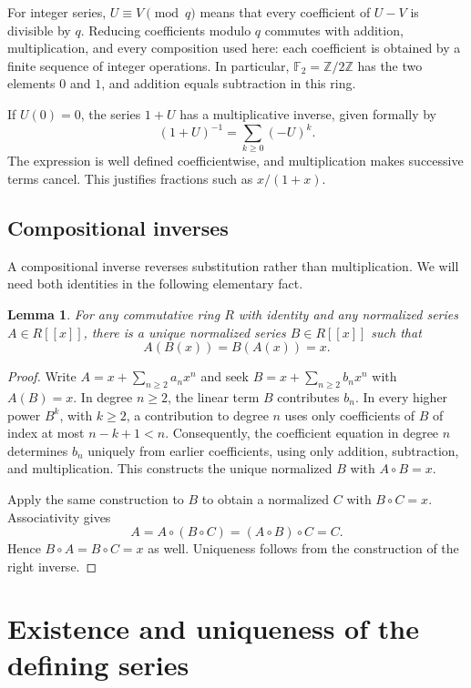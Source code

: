 \documentclass[11pt,a4paper]{article}
\newtheorem{lemma}[theorem]{Lemma}
\theoremstyle{remark}\newtheorem{remark}[theorem]{Remark}
\newcommand{\Z}{\mathbb Z}
\newcommand{\F}{\mathbb F}
\begin{document}
For integer series, $U\equiv V\pmod q$ means that every coefficient of
$U-V$ is divisible by $q$. Reducing coefficients modulo $q$ commutes with
addition, multiplication, and every composition used here: each coefficient
is obtained by a finite sequence of integer operations. In particular,
$\F_2=\Z/2\Z$ has the two elements $0$ and $1$, and addition equals
subtraction in this ring.

If $U(0)=0$, the series $1+U$ has a multiplicative inverse, given formally by
\[
 (1+U)^{-1}=\sum_{k\ge0}(-U)^k.
\]
The expression is well defined coefficientwise, and multiplication makes
successive terms cancel. This justifies fractions such as $x/(1+x)$.

\subsection{Compositional inverses}

A compositional inverse reverses substitution rather than multiplication.
We will need both identities in the following elementary fact.

\begin{lemma}\label{lem:inverse}
For any commutative ring $R$ with identity and any normalized series
$A\in R[[x]]$, there is a unique normalized series $B\in R[[x]]$ such that
\[
 A(B(x))=B(A(x))=x.
\]
\end{lemma}

\begin{proof}
Write $A=x+\sum_{n\ge2}a_nx^n$ and seek
$B=x+\sum_{n\ge2}b_nx^n$ with $A(B)=x$.
In degree $n\ge2$, the linear term $B$ contributes $b_n$.
In every higher power $B^k$, with $k\ge2$, a contribution to degree $n$
uses only coefficients of $B$ of index at most $n-k+1<n$.
Consequently, the coefficient equation in degree $n$ determines $b_n$
uniquely from earlier coefficients, using only addition, subtraction, and multiplication.
This constructs the unique normalized $B$ with $A\circ B=x$.

Apply the same construction to $B$ to obtain a normalized $C$ with
$B\circ C=x$. Associativity gives
\[
 A=A\circ(B\circ C)=(A\circ B)\circ C=C.
\]
Hence $B\circ A=B\circ C=x$ as well. Uniqueness follows from the
construction of the right inverse.
\end{proof}

\section{Existence and uniqueness of the defining series}
\end{document}
